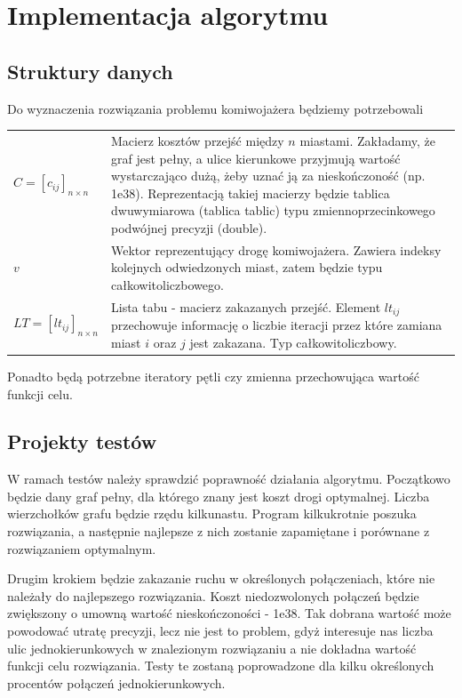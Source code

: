\documentclass[11pt,a4paper,twoside]{article}
\begin{document}
\section{Implementacja algorytmu}

\subsection{Struktury danych}
Do wyznaczenia rozwiązania problemu komiwojażera będziemy potrzebowali
\bgroup
\def\arraystretch{1.5}
\begin{tabularx}{\textwidth}{l|X}
$C = [c_{ij}]_{n\times n}$ & Macierz kosztów przejść między $n$ miastami. Zakładamy, że graf jest pełny, a ulice kierunkowe przyjmują wartość wystarczająco dużą, żeby uznać ją za nieskończoność (np. 1e38). Reprezentacją takiej macierzy będzie tablica dwuwymiarowa (tablica tablic) typu zmiennoprzecinkowego podwójnej precyzji (double).\\
$v$ & Wektor reprezentujący drogę komiwojażera. Zawiera indeksy kolejnych odwiedzonych miast, zatem będzie typu całkowitoliczbowego. \\
$LT = [lt_{ij}]_{n\times n}$ & Lista tabu - macierz zakazanych przejść. Element $lt_{ij}$ przechowuje informację o liczbie iteracji przez które zamiana miast $i$ oraz $j$ jest zakazana. Typ całkowitoliczbowy.\\
\end{tabularx}
\egroup

Ponadto będą potrzebne iteratory pętli czy zmienna przechowująca wartość funkcji celu.

\subsection{Projekty testów}
W ramach testów należy sprawdzić poprawność działania algorytmu. Początkowo będzie dany graf pełny, dla którego znany jest koszt drogi optymalnej. Liczba wierzchołków grafu będzie rzędu kilkunastu. Program kilkukrotnie poszuka rozwiązania, a następnie najlepsze z nich zostanie zapamiętane i porównane z rozwiązaniem optymalnym.

Drugim krokiem będzie zakazanie ruchu w określonych połączeniach, które nie należały do najlepszego rozwiązania. Koszt niedozwolonych połączeń będzie zwiększony o umowną wartość nieskończoności - 1e38. Tak dobrana wartość może powodować utratę precyzji, lecz nie jest to problem, gdyż interesuje nas liczba ulic jednokierunkowych w znalezionym rozwiązaniu a nie dokładna wartość funkcji celu rozwiązania. Testy te zostaną poprowadzone dla kilku określonych procentów połączeń jednokierunkowych.
	
\end{document}
